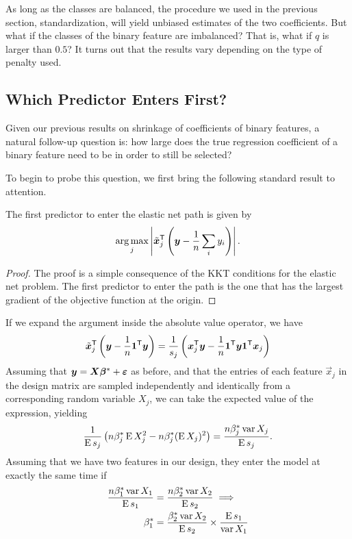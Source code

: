 As long as the classes are balanced, the procedure we used in the previous section, standardization, will yield unbiased estimates of the two coefficients. But what if the classes of the binary feature are imbalanced? That is, what if \(q\) is larger than \(0.5\)? It turns out that the results vary depending on the type of penalty used.

\subsection{Which Predictor Enters First?}

Given our previous results on shrinkage of coefficients of binary features, a natural follow-up question is: how large does the true regression coefficient of a binary feature need to be in order to still be selected?

To begin to probe this question, we first bring the following standard result to attention.

\begin{proposition}
  The first predictor to enter the elastic net path is given by
  \[
    \argmax_j\left| \tilde{\vec{x}}_j^\T\left(\vec{y} - \frac{1}{n}\sum_i y_i \right)\right|.
  \]
\end{proposition}
\begin{proof}
  The proof is a simple consequence of the KKT conditions for the elastic net problem. The first predictor to enter the path is the one that has the largest gradient of the objective function at the origin.
\end{proof}

If we expand the argument inside the absolute value operator, we have
\[
  \tilde{\vec{x}}_j^\T\left( \vec{y} - \frac{1}{n}\ones{}^\T \vec{y}\right) = \frac{1}{s_j}\left(\vec{x}_j^\T \vec{y} - \frac{1}{n}\ones^\T \vec{y} \ones^\T \vec{x}_j\right)
\]
Assuming that \(\vec{y} = \mat{X}\vec{\beta}^* + \vec{\varepsilon}\) as before, and that the entries of each feature \(\vec{x}_j\) in the design matrix are sampled independently and identically from a corresponding random variable \(X_j\), we can take the expected value of the expression, yielding
\[
  \frac{1}{\operatorname{\text{E}} s_j}\left( n \beta^*_j \operatorname{\text{E}} X_j^2 - n \beta^*_j (\operatorname{\text{E}} X_j)^2 \right) = \frac{n \beta^*_j\operatorname{var} X_j}{\operatorname{\text{E}} s_j}.
\]
Assuming that we have two features in our design, they enter the model at exactly the same time if
\[
  \begin{aligned}
    \frac{n \beta^*_1\operatorname{var} X_1}{\operatorname{\text{E}} s_1} & = \frac{n \beta^*_2\operatorname{var} X_2}{\operatorname{\text{E}} s_2} \implies                     \\
    \beta^*_1                          & = \frac{\beta^*_2\operatorname{var} X_2}{\operatorname{\text{E}} s_2} \times \frac{\operatorname{\text{E}} s_1}{\operatorname{var} X_1}
  \end{aligned}
\]

